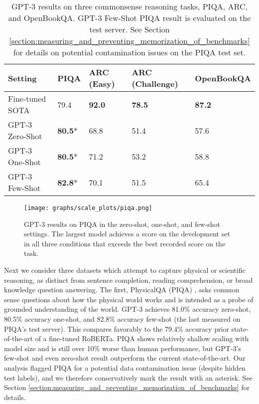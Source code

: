 \documentclass{article}
\begin{document}
\begin{table}
    \centering
        \begin{tabular}{l l l l l}
        \toprule
        Setting & PIQA & ARC (Easy) & ARC (Challenge) & OpenBookQA \\ 
        \midrule
        Fine-tuned SOTA & 79.4 & \textbf{92.0}\cite{khashabi2020unifiedqa} & \textbf{78.5}\cite{khashabi2020unifiedqa}  & \textbf{87.2}\cite{khashabi2020unifiedqa}  \\ 
        GPT-3 Zero-Shot  & \textbf{80.5}* & 68.8 & 51.4 & 57.6 \\
        GPT-3 One-Shot & \textbf{80.5}* & 71.2 & 53.2 & 58.8 \\
        GPT-3 Few-Shot & \textbf{82.8}* & 70.1 & 51.5 &  65.4 \\
        \bottomrule
        \end{tabular}
    \caption{GPT-3 results on three commonsense reasoning tasks, PIQA, ARC, and OpenBookQA. GPT-3 Few-Shot PIQA result is evaluated on the test server.  See Section \ref{section:measuring_and_preventing_memorization_of_benchmarks} for details on potential contamination issues on the PIQA test set.}
    \label{table:reasoning}
\end{table} \begin{figure}
\centering\texttt{[image: graphs/scale\_plots/piqa.png]}
\caption{GPT-3 results on PIQA in the zero-shot, one-shot, and few-shot settings. The largest model achieves a score on the development set in all three conditions that exceeds the best recorded score on the task.}
\label{graph:physicalqa}
\end{figure} Next we consider three datasets which attempt to capture physical or scientific reasoning, as distinct from sentence completion, reading comprehension, or broad knowledge question answering. The first, PhysicalQA (PIQA) \cite{bisk2019piqa}, asks common sense questions about how the physical world works and is intended as a probe of grounded understanding of the world. GPT-3 achieves 81.0\% accuracy zero-shot, 80.5\% accuracy one-shot, and 82.8\% accuracy few-shot (the last measured on PIQA's test server).  This compares favorably to the 79.4\% accuracy prior state-of-the-art of a fine-tuned RoBERTa. PIQA shows relatively shallow scaling with model size and is still over 10\% worse than human performance, but GPT-3's few-shot and even zero-shot result outperform the current state-of-the-art.  Our analysis flagged PIQA for a potential data contamination issue (despite hidden test labels), and we therefore conservatively mark the result with an asterisk. See Section \ref{section:measuring_and_preventing_memorization_of_benchmarks} for details.
\end{document}
